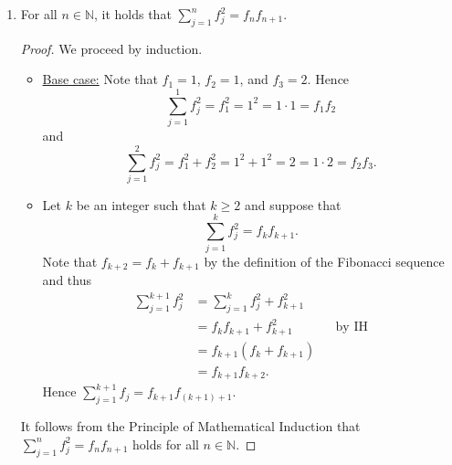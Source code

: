\documentclass[11pt]{article}
\def\naturals{\mathbb{N}}
\begin{document}
\begin{enumerate}
\begin{enumerate}
  \begin{Solution}
  \begin{proof}
   We proceed by induction.
  \begin{itemize}
   \item \underline{Base case:} Note that $f_1=1$, $f_2=1$, $f_3=2$, and $f_4=3$. Hence
   \[
    \sum_{j=1}^1 f_j = f_1 = 1 = 2-1 = f_3-1
   \]
   and 
   \[
    \sum_{j=1}^2 f_j = f_1 +f_2 = 1 + 1 = 3-1 = f_4-1.
    \]
\item \underline{} Let $k$ be an integer such that $k\geq 2$ and suppose that 
\[
 \sum_{j=1}^k f_j = f_{k+2}-1. \tag{IH}
\]
 Now $f_{k+3} = f_{k+1} + f_{k+2}$ by the definition of the Fibonacci sequence, thus
\begin{align*}
 \sum_{j=1}^{k+1} f_j &= \sum_{j=1}^{k} f_j + f_{k+1}\\
 & = (f_{k+2}-1) + f_{k+1} &&\text{by IH}\\
 & = f_{k+1} + f_{k+2} - 1\\
 & = f_{k+3} -1.
\end{align*}
Hence $\displaystyle\sum_{j=1}^{k+1} f_j = f_{(k+1)+2}-1$.
  \end{itemize}
It follows from the Principle of Mathematical Induction that $\displaystyle\sum_{j=1}^n f_j = f_{n+2}-1$ holds for all $n\in\naturals$.
 \end{proof}
\end{Solution}
 
 
 \item For all $n\in\naturals$, it holds that $\displaystyle\sum_{j=1}^n f_j^2 = f_nf_{n+1}$.
 
   \begin{Solution}
  \begin{proof}
   We proceed by induction.
  \begin{itemize}
   \item \underline{Base case:} Note that $f_1=1$, $f_2=1$, and $f_3=2$. Hence
   \[
    \sum_{j=1}^1 f_j^2 = f_1^2 = 1^2 = 1\cdot 1 = f_1f_2
   \]
   and 
   \[
    \sum_{j=1}^2 f_j^2 = f_1^2 +f_2^2 = 1^2 + 1^2 = 2 = 1\cdot 2 = f_2f_3.
    \]
\item \underline{} Let $k$ be an integer such that $k\geq 2$ and suppose that 
\[
 \sum_{j=1}^k f_j^2 = f_kf_{k+1}. \tag{IH}
\]
 Note that $f_{k+2} = f_k+f_{k+1}$ by the definition of the Fibonacci sequence and thus
\begin{align*}
 \sum_{j=1}^{k+1} f_j^2 &= \sum_{j=1}^{k} f_j^2 + f_{k+1}^2\\
 & = f_kf_{k+1} + f_{k+1}^2 &&\text{by IH}\\
 & = f_{k+1}(f_k + f_{k+1})\\
 & = f_{k+1}f_{k+2}.
\end{align*}
Hence $\displaystyle\sum_{j=1}^{k+1} f_j = f_{k+1}f_{(k+1)+1}$.
  \end{itemize}
It follows from the Principle of Mathematical Induction that $\displaystyle\sum_{j=1}^n f_j^2 = f_nf_{n+1}$ holds for all $n\in\naturals$.
 \end{proof}
\end{Solution}
 

\end{enumerate}
\end{enumerate}
\end{document}
